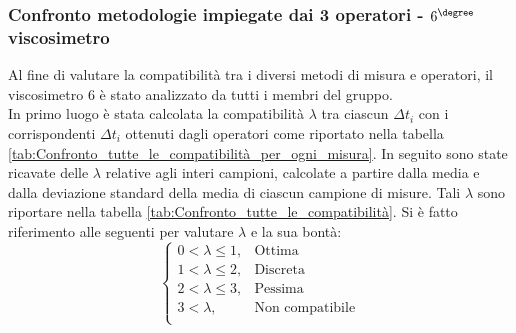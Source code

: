 \documentclass[a4paper,11pt,oneside]{article}
\begin{document}

\subsubsection*{Confronto metodologie impiegate dai 3 operatori - $6^{\degree}$ viscosimetro}%
Al fine di valutare la compatibilità tra i diversi metodi di misura e operatori, il viscosimetro 6 è stato analizzato da tutti i membri del gruppo.\\
In primo luogo è stata calcolata la compatibilità $\lambda$ tra ciascun $\Delta t_i$ con i corrispondenti $\Delta t_i$ ottenuti dagli operatori come riportato nella tabella \ref{tab:Confronto_tutte_le_compatibilità_per_ogni_misura}.
In seguito sono state ricavate delle $\lambda$ relative agli interi campioni, calcolate a partire dalla media e dalla deviazione standard della media di ciascun campione di misure. Tali $\lambda$ sono riportare nella tabella \ref{tab:Confronto_tutte_le_compatibilità}. Si è fatto riferimento alle seguenti per valutare $\lambda$ e la sua bontà:
\begin{equation*}%
    \label{eq:cases}
    \begin{cases}
    0<\lambda\leq 1, & \text{Ottima}\\
    1<\lambda\leq2, & \text{Discreta}\\
    2<\lambda\leq3, & \text{Pessima}\\
    3<\lambda, & \text{Non compatibile}\\
    \end{cases}
\end{equation*}
\end{document}
